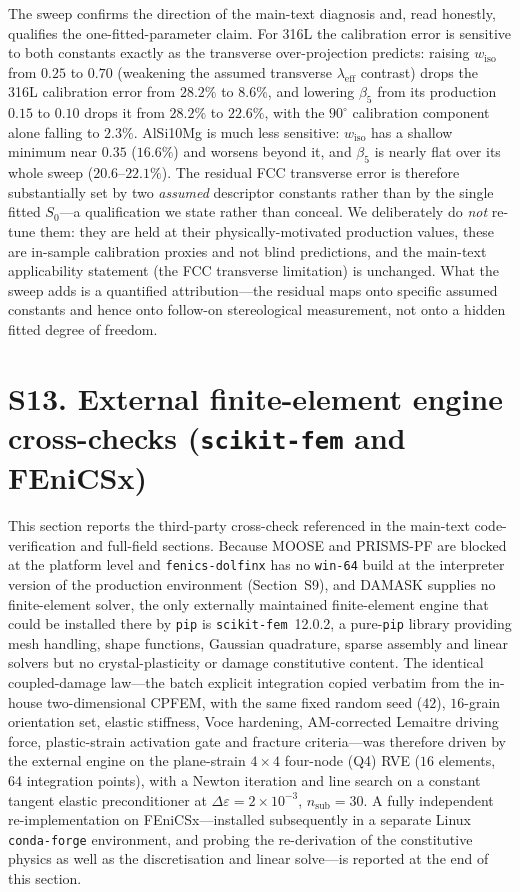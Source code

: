 \documentclass[11pt,a4paper,twocolumn]{article}
\providecommand{\ang}[1]{\ensuremath{#1^{\circ}}}
\begin{document}
The sweep confirms the direction of the main-text diagnosis and, read honestly, qualifies the one-fitted-parameter claim. For 316L the calibration error is sensitive to both constants exactly as the transverse over-projection predicts: raising $w_{\mathrm{iso}}$ from $0.25$ to $0.70$ (weakening the assumed transverse $\lambda_{\mathrm{eff}}$ contrast) drops the 316L calibration error from $28.2\%$ to $8.6\%$, and lowering $\beta_5$ from its production $0.15$ to $0.10$ drops it from $28.2\%$ to $22.6\%$, with the $\ang{90}$ calibration component alone falling to $2.3\%$. AlSi10Mg is much less sensitive: $w_{\mathrm{iso}}$ has a shallow minimum near $0.35$ ($16.6\%$) and worsens beyond it, and $\beta_5$ is nearly flat over its whole sweep ($20.6$--$22.1\%$). The residual FCC transverse error is therefore substantially set by two \emph{assumed} descriptor constants rather than by the single fitted $S_0$---a qualification we state rather than conceal. We deliberately do \emph{not} re-tune them: they are held at their physically-motivated production values, these are in-sample calibration proxies and not blind predictions, and the main-text applicability statement (the FCC transverse limitation) is unchanged. What the sweep adds is a quantified attribution---the residual maps onto specific assumed constants and hence onto follow-on stereological measurement, not onto a hidden fitted degree of freedom.

\section*{S13. External finite-element engine cross-checks (\texttt{scikit-fem} and FEniCSx)}

This section reports the third-party cross-check referenced in the main-text code-verification and
full-field sections. Because MOOSE and PRISMS-PF are blocked at the platform level and
\texttt{fenics-dolfinx} has no \texttt{win-64} build at the interpreter version of the production
environment (Section~S9), and DAMASK supplies no finite-element solver, the only externally maintained
finite-element engine that could be installed there by \texttt{pip} is \texttt{scikit-fem}~12.0.2, a
pure-\texttt{pip} library providing
mesh handling, shape functions, Gaussian quadrature, sparse assembly and linear solvers but no
crystal-plasticity or damage constitutive content. The identical coupled-damage law---the batch explicit
integration copied verbatim from the in-house two-dimensional CPFEM, with the same fixed random seed
($42$), $16$-grain orientation set, elastic stiffness, Voce hardening, AM-corrected Lemaitre driving force,
plastic-strain activation gate and fracture criteria---was therefore driven by the external engine on the
plane-strain $4\times4$ four-node (Q4) RVE ($16$ elements, $64$ integration points), with a Newton
iteration and line search on a constant tangent elastic preconditioner at $\Delta\varepsilon = 2\times10^{-3}$,
$n_{\mathrm{sub}} = 30$. A fully independent re-implementation on FEniCSx---installed subsequently in a
separate Linux \texttt{conda-forge} environment, and probing the re-derivation of the constitutive physics as
well as the discretisation and linear solve---is reported at the end of this section.
\end{document}
